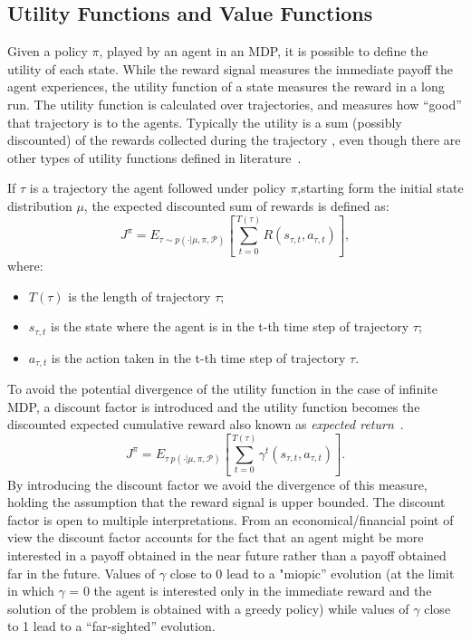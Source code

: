 \subsection{Utility Functions and Value Functions}
Given a policy $\pi$, played by an agent in an MDP, it is possible to define the utility of each state. While the reward signal measures the immediate payoff the agent experiences, the utility function of a state measures the reward in a long run. The utility function is calculated over trajectories, and measures how ``good'' that trajectory is to the agents. Typically the utility is a sum (possibly discounted) of the rewards collected during the trajectory , even though there are other types of utility functions defined in literature~\cite{Puterman:1994:MDP:528623}. \par
If $\tau$ is a trajectory the agent followed under policy $\pi$,starting form the initial state distribution $\mu$, the expected discounted sum of rewards is defined as:
\begin{equation}
		J^{\pi}=E_{\tau \sim p(\cdot |\mu,\pi,\mathcal{P})}\left[ \sum_{t=0}^{T(\tau)} R(s_{\tau,t},a_{\tau,t})\right],
\end{equation}
where:
\begin{itemize}
\item $T(\tau)$ is the length of trajectory $\tau$;
\item $s_{\tau,t}$ is the state where the agent is in the t-th time step of trajectory $\tau$;
\item $a_{\tau,t}$ is the action taken in the t-th time step of trajectory $\tau$.
\end{itemize}
To avoid the potential divergence of the utility function in the case of infinite MDP, a discount factor is introduced and the utility function becomes the discounted expected cumulative reward also known as \emph{expected return}~\cite{Sutton:1998:IRL:551283}.
\begin{equation}
		J^{\pi}=E_{\tau ~p(\cdot |\mu,\pi,\mathcal{P})}\left[ \sum_{t=0}^{T(\tau)} \gamma^{t}(s_{\tau,t},a_{\tau,t})\right].
\end{equation}
By introducing the discount factor we avoid the divergence of this measure, holding the assumption that the reward signal is upper bounded. The discount factor is open to multiple interpretations. From an economical/financial point of view the discount factor accounts for the fact that an agent might be more interested in a payoff obtained in the near future rather than a payoff obtained far in the future. Values of $\gamma$ close to 0 lead to a "miopic” evolution (at the limit in which $\gamma$ = 0 the agent is interested only in the immediate reward and the solution of the problem is obtained with a greedy policy) while values of $\gamma$ close to 1 lead to a “far-sighted” evolution.\par
